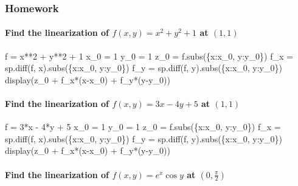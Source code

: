 \documentclass[
  letterpaper,
  DIV=11,
  numbers=noendperiod]{scrartcl}
\let\oldparagraph\paragraph
\renewcommand{\paragraph}[1]{\oldparagraph{#1}\mbox{}}
\newenvironment{Shaded}{\begin{snugshade}}{\end{snugshade}}
\newcommand{\NormalTok}[1]{\textcolor[rgb]{0.00,0.23,0.31}{#1}}
\begin{document}
\subsubsection{Homework}\label{homework-1}

\paragraph{\texorpdfstring{Find the linearization of
\(f(x, y) = x^2 + y^2 + 1\) at
\((1, 1)\)}{Find the linearization of f(x, y) = x\^{}2 + y\^{}2 + 1 at (1, 1)}}\label{find-the-linearization-of-fx-y-x2-y2-1-at-1-1}

\begin{Shaded}
\begin{Highlighting}[numbers=left,,]
\NormalTok{f = x**2 + y**2 + 1}
\NormalTok{x\_0 = 1}
\NormalTok{y\_0 = 1}
\NormalTok{z\_0 = f.subs(\{x:x\_0, y:y\_0\})}
\NormalTok{f\_x = sp.diff(f, x).subs(\{x:x\_0, y:y\_0\})}
\NormalTok{f\_y = sp.diff(f, y).subs(\{x:x\_0, y:y\_0\})}
\NormalTok{display(z\_0 + f\_x*(x{-}x\_0) + f\_y*(y{-}y\_0))}
\end{Highlighting}
\end{Shaded}

\paragraph{\texorpdfstring{Find the linearization of
\(f(x, y) = 3x-4y+5\) at
\((1, 1)\)}{Find the linearization of f(x, y) = 3x-4y+5 at (1, 1)}}\label{find-the-linearization-of-fx-y-3x-4y5-at-1-1}

\begin{Shaded}
\begin{Highlighting}[numbers=left,,]
\NormalTok{f = 3*x {-} 4*y + 5}
\NormalTok{x\_0 = 1}
\NormalTok{y\_0 = 1}
\NormalTok{z\_0 = f.subs(\{x:x\_0, y:y\_0\})}
\NormalTok{f\_x = sp.diff(f, x).subs(\{x:x\_0, y:y\_0\})}
\NormalTok{f\_y = sp.diff(f, y).subs(\{x:x\_0, y:y\_0\})}
\NormalTok{display(z\_0 + f\_x*(x{-}x\_0) + f\_y*(y{-}y\_0))}
\end{Highlighting}
\end{Shaded}

\paragraph{\texorpdfstring{Find the linearization of
\(f(x, y) = e^x \cos y\) at
\((0, \frac{\pi}{2})\)}{Find the linearization of f(x, y) = e\^{}x \textbackslash cos y at (0, \textbackslash frac\{\textbackslash pi\}\{2\})}}\label{find-the-linearization-of-fx-y-ex-cos-y-at-0-fracpi2}
\end{document}
